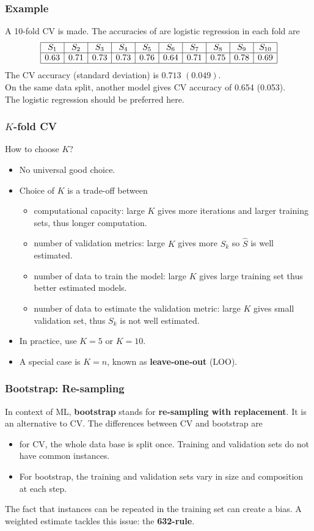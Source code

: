\begin{frame}
\frametitle{Example}
A 10-fold CV is made. The accuracies of are logistic regression in each fold are
$$
\begin{array}{|c|c|c|c|c|c|c|c|c|c|}
\hline
S_1 & S_2 & S_3 & S_4 & S_5 & S_6 & S_7 & S_8 & S_9 & S_{10}\\
\hline
0.63 & 0.71 & 0.73 & 0.73 & 0.76 & 0.64 & 0.71 & 0.75 & 0.78 & 0.69\\
\hline
\end{array}
$$
The CV accuracy (standard deviation) is $0.713$ $(0.049)$.\\
\vspace{0.3cm}
On the same data split, another model gives CV accuracy of 0.654 (0.053).\\ 
\vspace{0.3cm}
The logistic regression should be preferred here.
\end{frame}
\begin{frame}
\frametitle{$K$-fold CV}
\begin{center}
How to choose $K$?
\end{center}
\begin{itemize}
\item No universal good choice.
\item Choice of $K$ is a trade-off between 
\begin{itemize}
\item computational capacity: large $K$ gives more iterations and larger training sets, thus longer computation.
\item number of validation metrics: large $K$ gives more $S_k$ so $\hat{S}$ is well estimated.
\item number of data to train the model: large $K$ gives large training set thus better estimated models.
\item number of data to estimate the validation metric: large $K$ gives small validation set, thus $S_k$ is not well estimated.
\end{itemize}
\item In practice, use $K=5$ or $K=10$.\\
\item A special case is $K=n$, known as {\bf leave-one-out} (LOO). \\
\end{itemize} 
\end{frame}
\begin{frame}
\frametitle{Bootstrap: Re-sampling}
In context of ML, {\bf bootstrap} stands for {\bf re-sampling with replacement}. It is an alternative to CV. The differences between CV and bootstrap are
\begin{itemize}
\item for CV, the whole data base is split once. Training and validation sets do not have common instances.
\item For bootstrap, the training and validation sets vary in size and composition at each step. 
\end{itemize}
The fact that instances can be repeated in the training set can create a bias. A weighted estimate tackles this issue: the {\bf 632-rule}. 
\end{frame}
